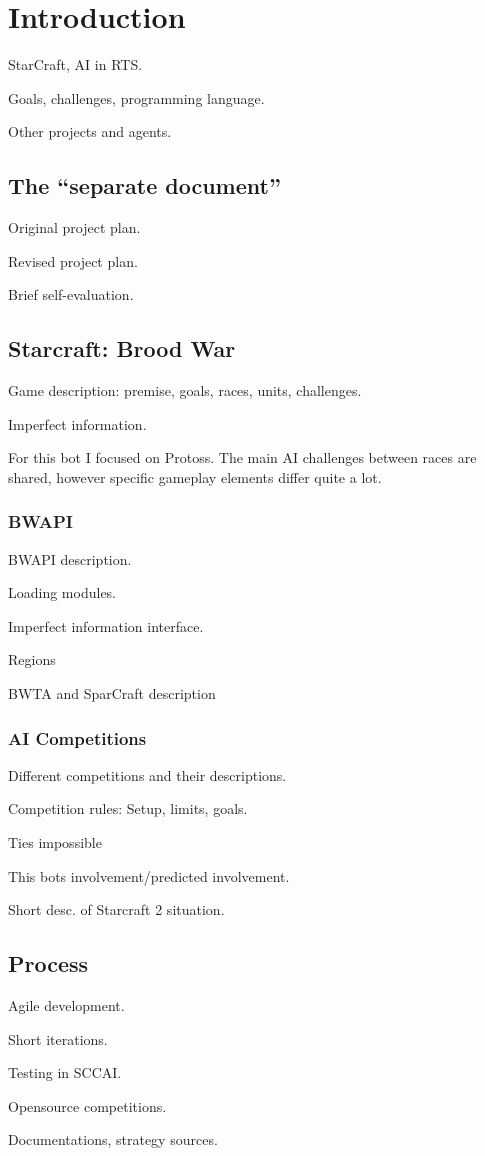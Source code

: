 \chapter{Introduction}
StarCraft, AI in RTS.

Goals, challenges, programming language.

Other projects and agents.

\section{The ``separate document''}
Original project plan.

Revised project plan.

Brief self-evaluation.

\section{Starcraft: Brood War}
Game description: premise, goals, races, units, challenges.

Imperfect information.

For this bot I focused on Protoss. The main AI challenges between races are shared, however specific gameplay elements differ quite a lot.

	\subsection*{BWAPI}
	BWAPI description.
	
	Loading modules.
		
	Imperfect information interface.

	Regions
	
	BWTA and SparCraft description

	\subsection*{AI Competitions}
	Different competitions and their descriptions.
	
	Competition rules: Setup, limits, goals.
	
	Ties impossible

	This bots involvement/predicted involvement.
	
	Short desc. of Starcraft 2 situation.

\section{Process}
Agile development.

Short iterations.

Testing in SCCAI.

Opensource competitions.

Documentations, strategy sources.